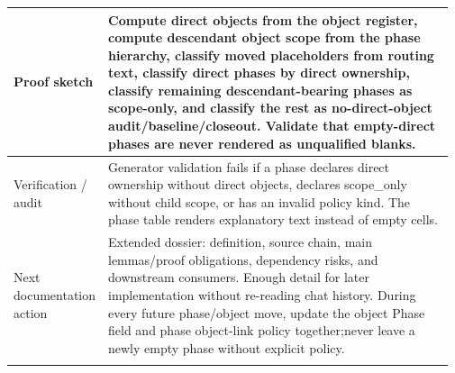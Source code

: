 \begin{longtable}{L{0.16\linewidth} L{0.81\linewidth}}
Proof sketch & Compute direct objects from the object register, compute descendant object scope from the phase hierarchy, classify moved placeholders from routing text, classify direct phases by direct ownership, classify remaining descendant-bearing phases as scope-only, and classify the rest as no-direct-object audit/\allowbreak{}baseline/\allowbreak{}closeout. Validate that empty-direct phases are never rendered as unqualified blanks.\\
\hline\addlinespace[0.20em]
Verification /\allowbreak{} audit & Generator validation fails if a phase declares direct ownership without direct objects, declares scope\_only without child scope, or has an invalid policy kind. The phase table renders explanatory text instead of empty cells.\\
\hline\addlinespace[0.20em]
Next documentation action & Extended dossier: definition, source chain, main lemmas/\allowbreak{}proof obligations, dependency risks, and downstream consumers. Enough detail for later implementation without re-reading chat history. During every future phase/\allowbreak{}object move, update the object Phase field and phase object-link policy together;\newline never leave a newly empty phase without explicit policy.\\
\hline\addlinespace[0.20em]
\end{longtable}
